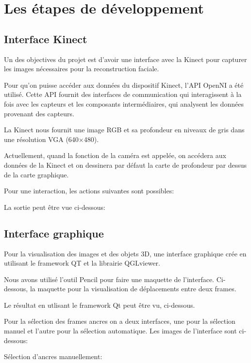 \documentclass[a4paper,11pt]{article}
\begin{document}
\section{Les étapes de développement}
\subsection*{Interface Kinect}

Un des objectives du projet est d’avoir une interface avec la Kinect pour capturer les images nécessaires pour la reconstruction faciale.

Pour qu’on puisse accéder aux données du dispositif Kinect, l’API OpenNI a été utilisé. Cette API fournit des interfaces de communication qui interagissent à la fois avec les capteurs et les composants intermédiaires, qui analysent les données provenant des capteurs.

La Kinect nous fournit une image RGB et sa profondeur en niveaux de gris dans une résolution VGA (640×480).

Actuellement, quand la fonction de la caméra est appelée, on accédera aux données de la Kinect et on dessinera par défaut la carte de profondeur par dessus de la carte graphique. 

Pour une interaction, les actions suivantes sont possibles: 


La sortie peut être vue ci-dessous:



\subsection*{Interface graphique}

Pour la visualisation des images et des objets 3D, une interface graphique crée en utilisant le framework QT et la librairie QGLviewer. 

Nous avons utilisé l’outil Pencil pour faire une maquette de l’interface. Ci-dessous, la maquette pour la visualisation de déplacements entre deux frames.

Le résultat en utlisant le framework Qt peut être vu, ci-dessous.

Pour la sélection des  frames ancres on a deux interfaces, une pour la sélection manuel et l’autre pour la sélection automatique. Les images de l’interface sont ci-dessous:

Sélection d'ancres manuellement: 
\end{document}
